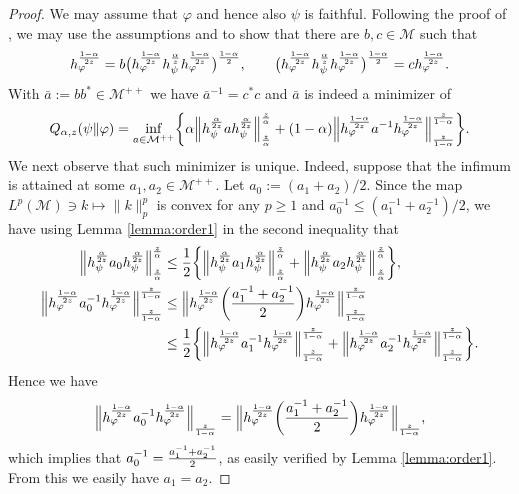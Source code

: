 \documentclass[12pt]{article}
\theoremstyle{definition}
\theoremstyle{remark}
\numberwithin{equation}{section}
\def\cM{\mathcal M}
\def\Me{\mathcal M}
\def\ffi{\varphi}
\begin{document}
\begin{proof} We may assume that $\varphi$ and hence also $\psi$ is faithful. Following
 the proof of \cite[Theorem 1 (vi)]{kato2023onrenyi},  we may use the
assumptions and \cite[Lemma A.58]{hiai2021quantum} to show  that there are $b,c\in\cM$  such that
\begin{align}\label{eq:bc}
h_\ffi^{1-\alpha\over2z}
=b\bigl(h_\ffi^{1-\alpha\over2z}h_\psi^{\alpha\over z}h_\ffi^{1-\alpha\over2z}\bigr)^{1-\alpha\over2},\qquad
\bigl(h_\ffi^{1-\alpha\over2z}h_\psi^{\alpha\over z}h_\ffi^{1-\alpha\over2z}\bigr)^{1-\alpha\over2}
=ch_\ffi^{1-\alpha\over2z}.
\end{align}
With $\bar a:=bb^*\in\cM^{++}$ we have  $\bar a^{-1}=c^*c$ and $\bar a$ is indeed a
minimizer of 
\begin{align}\label{eq:infimum}
Q_{\alpha,z}(\psi\|\ffi)
=\inf_{a\in\cM^{++}}\biggl\{\alpha\Big\|h_\psi^{\alpha\over2z}ah_\psi^{\alpha\over2z}\Big\|_{z\over\alpha}^{z\over\alpha}
+(1-\alpha)\Big\|h_\ffi^{1-\alpha\over2z}a^{-1}h_\ffi^{1-\alpha\over2z}\Big\|_{z\over
1-\alpha}^{z\over 1-\alpha}\biggr\}.
\end{align}
We next observe that such  minimizer is unique. Indeed, suppose that the infimum is
attained  at some $a_1,a_2\in \Me^{++}$. Let $a_0:=(a_1+a_2)/2$. Since the map 
$L^{p}(\cM)\ni k\mapsto\|k\|_{p}^{p}$ is convex for any $p\ge 1$ and
$a_0^{-1}\le(a_1^{-1}+a_2^{-1})/2$, we have using Lemma \ref{lemma:order1} in the second
inequality that  
\begin{align*}
\Big\|h_\psi^{\alpha\over2z}a_0h_\psi^{\alpha\over2z}\Big\|_{z\over\alpha}^{z\over\alpha}
&\le{1\over2}\biggl\{\Big\|h_\psi^{\alpha\over2z}a_1h_\psi^{\alpha\over2z}\Big\|_{z\over\alpha}^{z\over\alpha}
+\Big\|h_\psi^{\alpha\over2z}a_2h_\psi^{\alpha\over2z}\Big\|_{z\over\alpha}^{z\over\alpha}\biggr\}, \\
\Big\|h_\ffi^{1-\alpha\over2z}a_0^{-1}h_\ffi^{1-\alpha\over2z}\Big\|_{z\over1-\alpha}^{z\over1-\alpha}
&\le\Big\|h_\ffi^{1-\alpha\over2z}\biggl({a_1^{-1}+a_2^{-1}\over2}\biggr)
h_\ffi^{1-\alpha\over2z}\Big\|_{z\over1-\alpha}^{z\over1-\alpha} \\
&\le{1\over2}\biggl\{\Big\|h_\ffi^{1-\alpha\over2z}a_1^{-1}h_\ffi^{1-\alpha\over2z}\Big\|_{z\over1-\alpha}^{z\over1-\alpha}
+\Big\|h_\ffi^{1-\alpha\over2z}a_2^{-1}h_\ffi^{1-\alpha\over2z}\Big\|_{z\over1-\alpha}^{z\over1-\alpha}\biggr\}.
\end{align*}
Hence we have
\[
\Big\|h_\ffi^{1-\alpha\over2z}a_0^{-1}h_\ffi^{1-\alpha\over2z}\Big\|_{z\over1-\alpha}
=\Big\|h_\ffi^{1-\alpha\over2z}\biggl({a_1^{-1}+a_2^{-1}\over2}\biggr)
h_\ffi^{1-\alpha\over2z}\Big\|_{z\over1-\alpha},
\]
which implies that $a_0^{-1}={a_1^{-1}+a_2^{-1}\over2}$, as easily verified by Lemma
\ref{lemma:order1}. From this we easily have $a_1=a_2$.


\end{proof}
\end{document}
